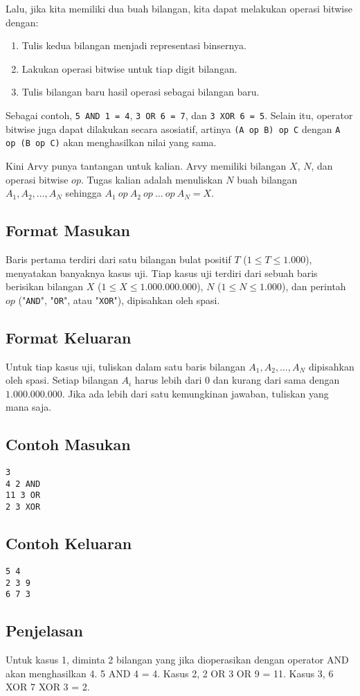 \documentclass{article}
\begin{document}
Lalu, jika kita memiliki dua buah bilangan, kita dapat melakukan operasi bitwise dengan:
\begin{enumerate}
    \item Tulis kedua bilangan menjadi representasi binsernya.
    \item Lakukan operasi bitwise untuk tiap digit bilangan.
    \item Tulis bilangan baru hasil operasi sebagai bilangan baru.
\end{enumerate}

Sebagai contoh, \lstinline{5 AND 1 = 4}, \lstinline{3 OR 6 = 7}, dan \lstinline{3 XOR 6 = 5}.
Selain itu, operator bitwise juga dapat dilakukan secara asosiatif, artinya \lstinline{(A op B) op C} dengan \lstinline{A op (B op C)} akan menghasilkan nilai yang sama.

Kini Arvy punya tantangan untuk kalian.
Arvy memiliki bilangan $X$, $N$, dan operasi bitwise $op$.
Tugas kalian adalah menuliskan $N$ buah bilangan $A_1, A_2, \dots, A_N$ sehingga $A_1 \  op \  A_2 \  op \  \dots \  op \  A_N = X$.

\subsection*{Format Masukan}

Baris pertama terdiri dari satu bilangan bulat positif $T$ ($1 \leq T \leq 1.000$), menyatakan banyaknya kasus uji.
Tiap kasus uji terdiri dari sebuah baris berisikan bilangan $X$ ($1 \leq X \leq 1.000.000.000$), $N$ ($1 \leq N \leq 1.000$), dan perintah $op$ ("\lstinline{AND}", "\lstinline{OR}", atau "\lstinline{XOR}"), dipisahkan oleh spasi.

\subsection*{Format Keluaran}

Untuk tiap kasus uji, tuliskan dalam satu baris bilangan $A_1, A_2, \dots, A_N$ dipisahkan oleh spasi.
Setiap bilangan $A_i$ harus lebih dari $0$ dan kurang dari sama dengan $1.000.000.000$.
Jika ada lebih dari satu kemungkinan jawaban, tuliskan yang mana saja.

\begin{multicols}{2}
\subsection*{Contoh Masukan}
\begin{lstlisting}
3
4 2 AND
11 3 OR
2 3 XOR
\end{lstlisting}
\columnbreak
\subsection*{Contoh Keluaran}
\begin{lstlisting}
5 4
2 3 9
6 7 3
\end{lstlisting}
\vfill
\null
\end{multicols}
\subsection*{Penjelasan}
 Untuk kasus 1, diminta 2 bilangan yang jika dioperasikan dengan operator AND akan menghasilkan 4. 5 AND 4 = 4. Kasus 2, 2 OR 3 OR 9 = 11. Kasus 3, 6 XOR 7 XOR 3 = 2.

\pagebreak
\end{document}
